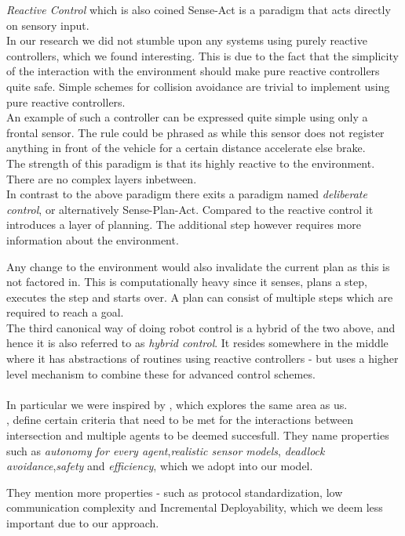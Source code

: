 \textit{Reactive Control} which is also coined Sense-Act is a paradigm that acts directly on sensory input.\\
In our research we did not stumble upon any systems using purely reactive controllers, which we found interesting. This is due to the fact that the simplicity of the interaction with the environment should make pure reactive controllers quite safe.
Simple schemes for collision avoidance are trivial to implement using pure reactive controllers.\\
An example of such a controller can be expressed quite simple using only a frontal sensor. The rule could be phrased as while this sensor does not register anything in front of the vehicle for a certain distance accelerate else brake.\\
The strength of this paradigm is that its highly reactive to the environment. There are no complex layers inbetween.\\

In contrast to the above paradigm there exits a paradigm named \textit{deliberate control}, or alternatively Sense-Plan-Act.
Compared to the reactive control it introduces a layer of planning.
The additional step however requires more information about the environment.

Any change to the environment would also invalidate the current plan as this is not factored in.
This is computationally heavy since it senses, plans a step, executes the step and starts over.
A plan can consist of multiple steps which are required to reach a goal.\\

The third canonical way of doing robot control is a hybrid of the two above, and hence it is also referred to as \textit{hybrid control}.
It resides somewhere in the middle where it has abstractions of routines using reactive controllers - but uses a higher level mechanism to combine these for advanced control schemes.\\


\\

In particular we were inspired by \citeauthor{texas}\citep{texas}, which explores the same area as us.\\
\citeauthor{texas}, define certain criteria that need to be met for the interactions between intersection and multiple agents to be deemed succesfull.
They name properties such as \textit{autonomy for every agent},\textit{realistic sensor models}, \textit{deadlock avoidance},\textit{safety} and \textit{efficiency}, which we adopt into our model.

They mention more properties - such as protocol standardization, low communication complexity and Incremental Deployability, which we deem less important due to our approach.